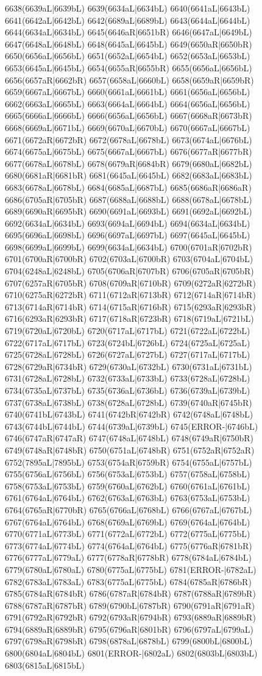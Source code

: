 6638(6639aL|6639bL) 6639(6634aL|6634bL) 6640(6641aL|6643bL) 6641(6642aL|6642bL) 6642(6689aL|6689bL) 6643(6644aL|6644bL) 6644(6634aL|6634bL) 6645(6646aR|6651bR) 6646(6647aL|6649bL) 6647(6648aL|6648bL) 6648(6645aL|6645bL) 6649(6650aR|6650bR) 6650(6656aL|6656bL) 6651(6652aL|6654bL) 6652(6653aL|6653bL) 6653(6645aL|6645bL) 6654(6655aR|6655bR) 6655(6656aL|6656bL) 6656(6657aR|6662bR) 6657(6658aL|6660bL) 6658(6659aR|6659bR) 6659(6667aL|6667bL) 6660(6661aL|6661bL) 6661(6656aL|6656bL) 6662(6663aL|6665bL) 6663(6664aL|6664bL) 6664(6656aL|6656bL) 6665(6666aL|6666bL) 6666(6656aL|6656bL) 6667(6668aR|6673bR) 6668(6669aL|6671bL) 6669(6670aL|6670bL) 6670(6667aL|6667bL) 6671(6672aR|6672bR) 6672(6678aL|6678bL) 6673(6674aL|6676bL) 6674(6675aL|6675bL) 6675(6667aL|6667bL) 6676(6677aR|6677bR) 6677(6678aL|6678bL) 6678(6679aR|6684bR) 6679(6680aL|6682bL) 6680(6681aR|6681bR) 6681(6645aL|6645bL) 6682(6683aL|6683bL) 6683(6678aL|6678bL) 6684(6685aL|6687bL) 6685(6686aR|6686aR) 6686(6705aR|6705bR) 6687(6688aL|6688bL) 6688(6678aL|6678bL) 6689(6690aR|6695bR) 6690(6691aL|6693bL) 6691(6692aL|6692bL) 6692(6634aL|6634bL) 6693(6694aL|6694bL) 6694(6634aL|6634bL) 6695(6696aL|6698bL) 6696(6697aL|6697bL) 6697(6645aL|6645bL) 6698(6699aL|6699bL) 6699(6634aL|6634bL) 6700(6701aR|6702bR) 6701(6700aR|6700bR) 6702(6703aL|6700bR) 6703(6704aL|6704bL) 6704(6248aL|6248bL) 6705(6706aR|6707bR) 6706(6705aR|6705bR) 6707(6257aR|6705bR) 6708(6709aR|6710bR) 6709(6272aR|6272bR) 6710(6275aR|6272bR) 6711(6712aR|6713bR) 6712(6714aR|6714bR) 6713(6714aR|6714bR) 6714(6715aR|6716bR) 6715(6293aR|6293bR) 6716(6293aR|6293bR) 6717(6718aR|6723bR) 6718(6719aL|6721bL) 6719(6720aL|6720bL) 6720(6717aL|6717bL) 6721(6722aL|6722bL) 6722(6717aL|6717bL) 6723(6724bL|6726bL) 6724(6725aL|6725aL) 6725(6728aL|6728bL) 6726(6727aL|6727bL) 6727(6717aL|6717bL) 6728(6729aR|6734bR) 6729(6730aL|6732bL) 6730(6731aL|6731bL) 6731(6728aL|6728bL) 6732(6733aL|6733bL) 6733(6728aL|6728bL) 6734(6735aL|6737bL) 6735(6736aL|6736bL) 6736(6739aL|6739bL) 6737(6738aL|6738bL) 6738(6728aL|6728bL) 6739(6740aR|6745bR) 6740(6741bL|6743bL) 6741(6742bR|6742bR) 6742(6748aL|6748bL) 6743(6744bL|6744bL) 6744(6739aL|6739bL) 6745(ERROR-|6746bL) 6746(6747aR|6747aR) 6747(6748aL|6748bL) 6748(6749aR|6750bR) 6749(6748aR|6748bR) 6750(6751aL|6748bR) 6751(6752aR|6752aR) 6752(7895aL|7895bL) 6753(6754aR|6759bR) 6754(6755aL|6757bL) 6755(6756aL|6756bL) 6756(6753aL|6753bL) 6757(6758aL|6758bL) 6758(6753aL|6753bL) 6759(6760aL|6762bL) 6760(6761aL|6761bL) 6761(6764aL|6764bL) 6762(6763aL|6763bL) 6763(6753aL|6753bL) 6764(6765aR|6770bR) 6765(6766aL|6768bL) 6766(6767aL|6767bL) 6767(6764aL|6764bL) 6768(6769aL|6769bL) 6769(6764aL|6764bL) 6770(6771aL|6773bL) 6771(6772aL|6772bL) 6772(6775aL|6775bL) 6773(6774aL|6774bL) 6774(6764aL|6764bL) 6775(6776aR|6781bR) 6776(6777aL|6779aL) 6777(6778aR|6778bR) 6778(6784aL|6784bL) 6779(6780aL|6780aL) 6780(6775aL|6775bL) 6781(ERROR-|6782aL) 6782(6783aL|6783aL) 6783(6775aL|6775bL) 6784(6785aR|6786bR) 6785(6784aR|6784bR) 6786(6787aR|6784bR) 6787(6788aR|6789bR) 6788(6787aR|6787bR) 6789(6790bL|6787bR) 6790(6791aR|6791aR) 6791(6792aR|6792bR) 6792(6793aR|6794bR) 6793(6889aR|6889bR) 6794(6889aR|6889bR) 6795(6796aR|6801bR) 6796(6797aL|6799aL) 6797(6798aR|6798bR) 6798(6878aL|6878bL) 6799(6800bL|6800bL) 6800(6804aL|6804bL) 6801(ERROR-|6802aL) 6802(6803bL|6803bL) 6803(6815aL|6815bL) 